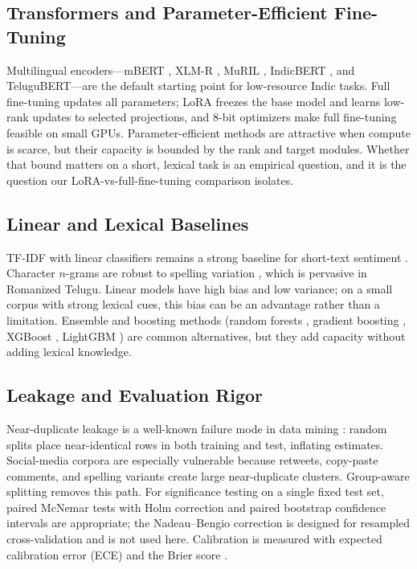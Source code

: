 \documentclass[10pt,journal]{IEEEtran}
\begin{document}
\subsection{Transformers and Parameter-Efficient Fine-Tuning}
Multilingual encoders---mBERT \cite{devlin2019}, XLM-R \cite{conneau2020}, MuRIL \cite{khan2021}, IndicBERT \cite{kakwani2020}, and TeluguBERT---are the default starting point for low-resource Indic tasks. Full fine-tuning updates all parameters; LoRA \cite{hu2022} freezes the base model and learns low-rank updates to selected projections, and 8-bit optimizers \cite{dettmers2023} make full fine-tuning feasible on small GPUs. Parameter-efficient methods are attractive when compute is scarce, but their capacity is bounded by the rank and target modules. Whether that bound matters on a short, lexical task is an empirical question, and it is the question our LoRA-vs-full-fine-tuning comparison isolates.

\subsection{Linear and Lexical Baselines}
TF-IDF with linear classifiers remains a strong baseline for short-text sentiment \cite{salton1988,manning2008}. Character $n$-grams are robust to spelling variation \cite{cavnar1994}, which is pervasive in Romanized Telugu. Linear models have high bias and low variance; on a small corpus with strong lexical cues, this bias can be an advantage rather than a limitation. Ensemble and boosting methods (random forests \cite{breiman2001}, gradient boosting \cite{friedman2001}, XGBoost \cite{chen2016}, LightGBM \cite{ke2017}) are common alternatives, but they add capacity without adding lexical knowledge.

\subsection{Leakage and Evaluation Rigor}
Near-duplicate leakage is a well-known failure mode in data mining \cite{kaufman2012}: random splits place near-identical rows in both training and test, inflating estimates. Social-media corpora are especially vulnerable because retweets, copy-paste comments, and spelling variants create large near-duplicate clusters. Group-aware splitting removes this path. For significance testing on a single fixed test set, paired McNemar tests \cite{dietterich1998} with Holm correction \cite{holm1979} and paired bootstrap confidence intervals \cite{efron1993} are appropriate; the Nadeau--Bengio correction \cite{nadeau2003} is designed for resampled cross-validation and is not used here. Calibration is measured with expected calibration error (ECE) and the Brier score \cite{guo2017}.
\end{document}
